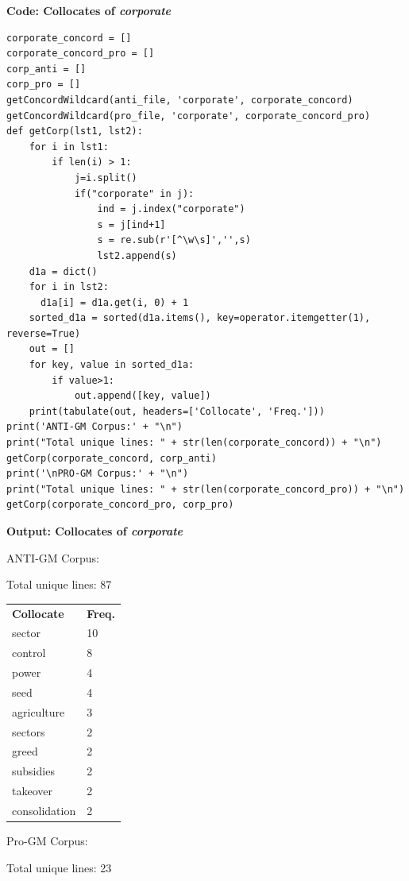 \textbf{Code: Collocates of \textit{corporate}}
\begin{lstlisting}
corporate_concord = []
corporate_concord_pro = []
corp_anti = []
corp_pro = []
getConcordWildcard(anti_file, 'corporate', corporate_concord) 
getConcordWildcard(pro_file, 'corporate', corporate_concord_pro) 
def getCorp(lst1, lst2):
    for i in lst1:
        if len(i) > 1:
            j=i.split()
            if("corporate" in j):
                ind = j.index("corporate")
                s = j[ind+1]
                s = re.sub(r'[^\w\s]','',s)
                lst2.append(s)
    d1a = dict()
    for i in lst2:
      d1a[i] = d1a.get(i, 0) + 1
    sorted_d1a = sorted(d1a.items(), key=operator.itemgetter(1), reverse=True)
    out = []
    for key, value in sorted_d1a:
        if value>1:
            out.append([key, value])
    print(tabulate(out, headers=['Collocate', 'Freq.']))
print('ANTI-GM Corpus:' + "\n")                     
print("Total unique lines: " + str(len(corporate_concord)) + "\n")
getCorp(corporate_concord, corp_anti)      
print('\nPRO-GM Corpus:' + "\n")            
print("Total unique lines: " + str(len(corporate_concord_pro)) + "\n")
getCorp(corporate_concord_pro, corp_pro) 
\end{lstlisting}

\textbf{Output: Collocates of \textit{corporate}}

\begin{footnotesize}
ANTI-GM Corpus:

Total unique lines: 87
\end{footnotesize}

\begin{table}[H]
\begin{footnotesize}
\begin{tabular}{ll}
\textbf{Collocate} & \textbf{Freq.} \\
sector             & 10             \\
control            & 8              \\
power              & 4              \\
seed               & 4              \\
agriculture        & 3              \\
sectors            & 2              \\
greed              & 2              \\
subsidies          & 2              \\
takeover           & 2              \\
consolidation      & 2             
\end{tabular}
\end{footnotesize}
\end{table}
\begin{footnotesize}
Pro-GM Corpus:

Total unique lines: 23
\end{footnotesize}

